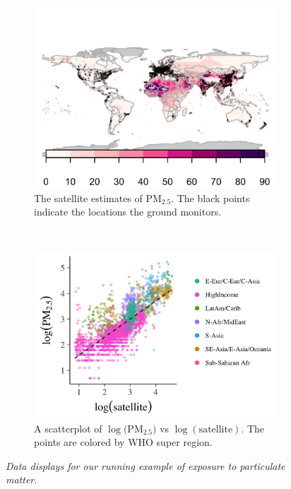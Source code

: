 \documentclass{statsoc}
\newcommand{\PM}{PM$_{2.5}$}
\begin{document}
\begin{figure}
\begin{subfigure}{0.49\textwidth}
\includegraphics[width=\textwidth]{map-data2.png}
\caption{The satellite estimates of \PM. The black points indicate the locations
the ground monitors.}
\label{fig:datamap}
\end{subfigure}
~
\begin{subfigure}{0.49\textwidth}
\includegraphics[width=\textwidth]{plot1.png}
\caption{A scatterplot of $\log($\PM$)$ vs $\log(\text{satellite})$. The points
are colored by WHO super region.
}
\label{fig:plot1}
\end{subfigure}
\caption{\it Data displays for our running example of exposure to particulate matter.}
\end{figure}
\end{document}

